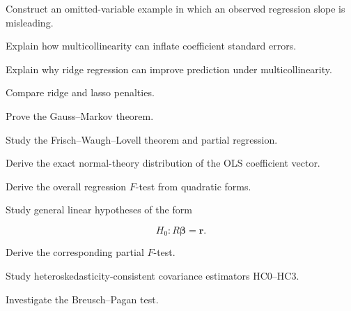 \begin{exercise}[3]
Construct an omitted-variable example in which an observed regression
slope is misleading.
\end{exercise}

\begin{exercise}[3]
Explain how multicollinearity can inflate coefficient standard errors.
\end{exercise}

\begin{exercise}[3]
Explain why ridge regression can improve prediction under
multicollinearity.
\end{exercise}

\begin{exercise}[3]
Compare ridge and lasso penalties.
\end{exercise}

\begin{exercise}[4]
Prove the Gauss--Markov theorem.
\end{exercise}

\begin{exercise}[4]
Study the Frisch--Waugh--Lovell theorem and partial regression.
\end{exercise}

\begin{exercise}[4]
Derive the exact normal-theory distribution of the OLS coefficient
vector.
\end{exercise}

\begin{exercise}[4]
Derive the overall regression \(F\)-test from quadratic forms.
\end{exercise}

\begin{exercise}[4]
Study general linear hypotheses of the form

\[
H_0:
R\boldsymbol{\beta}
=
\mathbf{r}.
\]
\end{exercise}

\begin{exercise}[4]
Derive the corresponding partial \(F\)-test.
\end{exercise}

\begin{exercise}[4]
Study heteroskedasticity-consistent covariance estimators HC0--HC3.
\end{exercise}

\begin{exercise}[4]
Investigate the Breusch--Pagan test.
\end{exercise}

